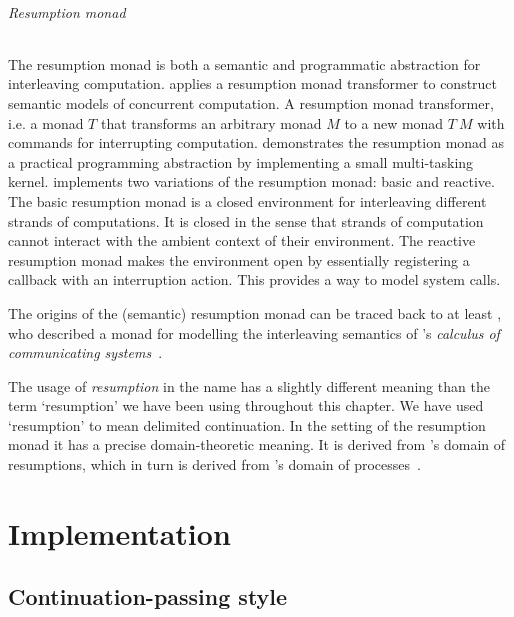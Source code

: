 \documentclass[12pt,phd,lfcs,twoside,openright,logo,leftchapter,normalheadings]{infthesis}
\theoremstyle{plain}
\theoremstyle{definition}
\begin{document}
\paragraph{Resumption monad}
The resumption monad is both a semantic and programmatic abstraction
for interleaving computation. \citet{Papaspyrou01} applies a
resumption monad transformer to construct semantic models of
concurrent computation. A resumption monad transformer, i.e. a monad
$T$ that transforms an arbitrary monad $M$ to a new monad $T~M$ with
commands for interrupting computation.
%
\citet{Harrison06} demonstrates the resumption monad as a practical
programming abstraction by implementing a small multi-tasking
kernel. \citeauthor{Harrison06} implements two variations of the
resumption monad: basic and reactive. The basic resumption monad is a
closed environment for interleaving different strands of
computations. It is closed in the sense that strands of computation
cannot interact with the ambient context of their environment. The
reactive resumption monad makes the environment open by essentially
registering a callback with an interruption action. This provides a
way to model system calls.

The origins of the (semantic) resumption monad can be traced back to
at least \citet{Moggi90}, who described a monad for modelling the
interleaving semantics of \citeauthor{Milner75}'s \emph{calculus of
  communicating systems}~\cite{Milner75}.

The usage of \emph{resumption} in the name has a slightly different
meaning than the term `resumption' we have been using throughout this
chapter. We have used `resumption' to mean delimited continuation. In
the setting of the resumption monad it has a precise domain-theoretic
meaning. It is derived from \citeauthor{Plotkin76}'s domain of
resumptions, which in turn is derived from \citeauthor{Milner75}'s
domain of processes~\cite{Milner75,Plotkin76}.


\part{Implementation}
\label{p:implementation}

\chapter{Continuation-passing style}
\label{ch:cps}
\end{document}
